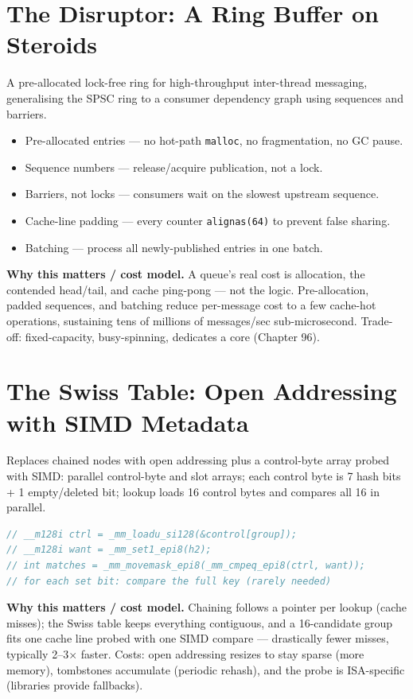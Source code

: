 \section{The Disruptor: A Ring Buffer on Steroids}
A pre-allocated lock-free ring for high-throughput inter-thread messaging, generalising the SPSC ring to a consumer dependency graph using sequences and barriers.
\begin{itemize}
\item Pre-allocated entries --- no hot-path \texttt{malloc}, no fragmentation, no GC pause.
\item Sequence numbers --- release/acquire publication, not a lock.
\item Barriers, not locks --- consumers wait on the slowest upstream sequence.
\item Cache-line padding --- every counter \texttt{alignas(64)} to prevent false sharing.
\item Batching --- process all newly-published entries in one batch.
\end{itemize}

\textbf{Why this matters / cost model.} A queue's real cost is allocation, the contended head/tail, and cache ping-pong --- not the logic. Pre-allocation, padded sequences, and batching reduce per-message cost to a few cache-hot operations, sustaining tens of millions of messages/sec sub-microsecond. Trade-off: fixed-capacity, busy-spinning, dedicates a core (Chapter 96).

\section{The Swiss Table: Open Addressing with SIMD Metadata}
Replaces chained nodes with open addressing plus a control-byte array probed with SIMD: parallel control-byte and slot arrays; each control byte is 7 hash bits + 1 empty/deleted bit; lookup loads 16 control bytes and compares all 16 in parallel.

\begin{lstlisting}[language=C++, caption={Swiss-table SIMD probe: 16 candidates in one instruction. x86-specific. Min standard: C++17.}]
// __m128i ctrl = _mm_loadu_si128(&control[group]);
// __m128i want = _mm_set1_epi8(h2);
// int matches = _mm_movemask_epi8(_mm_cmpeq_epi8(ctrl, want));
// for each set bit: compare the full key (rarely needed)
\end{lstlisting}

\textbf{Why this matters / cost model.} Chaining follows a pointer per lookup (cache misses); the Swiss table keeps everything contiguous, and a 16-candidate group fits one cache line probed with one SIMD compare --- drastically fewer misses, typically 2--3$\times$ faster. Costs: open addressing resizes to stay sparse (more memory), tombstones accumulate (periodic rehash), and the probe is ISA-specific (libraries provide fallbacks).

